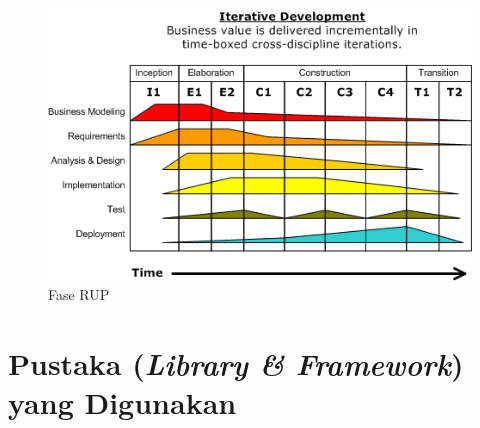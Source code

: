 \begin{figure}[H]
      \centering
      \includegraphics[scale=0.7]{assets/rup.png}
      \caption{Fase RUP}
      \label{fig:rup}
\end{figure}

\section{Pustaka (\emph{Library \& Framework}) yang Digunakan}


